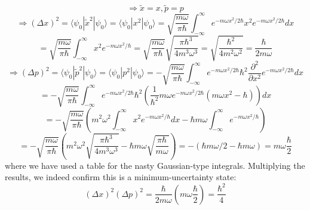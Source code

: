 \documentclass{article}
\begin{document}
\[
  \Rightarrow \tilde{x}=x, \tilde{p}=p
\]
\[
  \Rightarrow (\Delta x)^{2}=\langle \psi_{0}|\tilde{x}^{2}|\psi_{0} \rangle=\langle \psi_{0}|x^{2}|\psi_{0} \rangle
  =\sqrt{\frac{m\omega}{\pi\hbar}}\int_{-\infty}^{\infty}e^{-m\omega x^{2}/2\hbar}x^{2}e^{-m\omega x^{2}/2\hbar}dx
\]
\[
  =\sqrt{\frac{m\omega}{\pi\hbar}}\int_{-\infty}^{\infty}x^{2}e^{-m\omega x^{2}/\hbar}
  =\sqrt{\frac{m\omega}{\pi\hbar}}\sqrt{\frac{\pi\hbar^{3}}{4m^{3}\omega^{3}}}
  =\sqrt{\frac{\hbar^{2}}{4m^{2}\omega^{2}}}=\frac{\hbar}{2m\omega}
\]
\[
  \Rightarrow (\Delta p)^{2}=\langle \psi_{0}|\tilde{p}^{2}|\psi_{0} \rangle=\langle \psi_{0}|p^{2}|\psi_{0} \rangle
  =-\sqrt{\frac{m\omega}{\pi\hbar}}\int_{-\infty}^{\infty}e^{-m\omega x^{2}/2\hbar}\hbar^{2}\frac{\partial^{2}}{\partial x^{2}}
  e^{-m\omega x^{2}/2\hbar}dx
\]
\[
  =-\sqrt{\frac{m\omega}{\pi\hbar}}\int_{-\infty}^{\infty}e^{-m\omega x^{2}/2\hbar}
  \hbar^{2}\left( \frac{1}{\hbar^{2}} m\omega e^{-m\omega x^{2}/2\hbar}(m\omega x^{2}-\hbar)\right)dx
\]
\[
  =-\sqrt{\frac{m\omega}{\pi\hbar}}\left( m^{2}\omega^{2}\int_{-\infty}^{\infty}x^{2}e^{-m\omega x^{2}/\hbar}dx
    -\hbar m\omega\int_{-\infty}^{\infty}e^{-m\omega x^{2}/\hbar}\right)
\]
\[
  =-\sqrt{\frac{m\omega}{\pi\hbar}}\left( m^{2}\omega^{2}\sqrt{\frac{\pi \hbar^{3}}{4m^{3}\omega^{3}}}
    -\hbar m\omega\sqrt{\frac{\pi\hbar}{m\omega}} \right)
  =-(\hbar m\omega/2-\hbar m\omega)=m\omega\frac{\hbar}{2}
\]
where we have used a table for the nasty Gaussian-type integrals.
Multiplying the results, we indeed confirm this is a minimum-uncertainty state:
\[
  (\Delta x)^{2}(\Delta p)^{2}=\frac{\hbar}{2m\omega}\left( m\omega\frac{\hbar}{2}\right)=\frac{\hbar^{2}}{4}
\]

\end{document}
